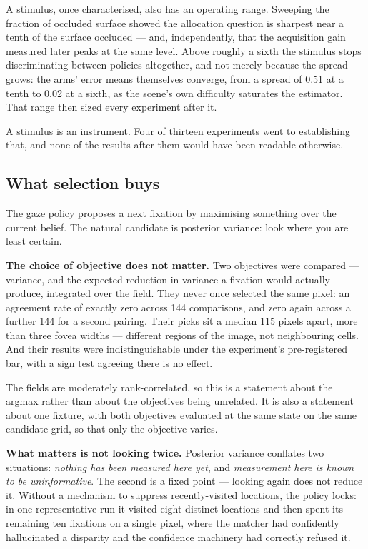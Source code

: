 A stimulus, once characterised, also has an operating range. Sweeping the
fraction of occluded surface showed the allocation question is sharpest near a
tenth of the surface occluded --- and, independently, that the acquisition gain
measured later peaks at the same level. Above roughly a sixth the stimulus stops
discriminating between policies altogether, and not merely because the spread
grows: the arms' error means themselves converge, from a spread of 0.51 at a
tenth to 0.02 at a sixth, as the scene's own difficulty saturates the estimator.
That range then sized every experiment after it.

A stimulus is an instrument. Four of thirteen experiments went to establishing
that, and none of the results after them would have been readable otherwise.

\subsection{What selection buys}

The gaze policy proposes a next fixation by maximising something over the
current belief. The natural candidate is posterior variance: look where you are
least certain.

\textbf{The choice of objective does not matter.} Two objectives were compared
--- variance, and the expected reduction in variance a fixation would actually
produce, integrated over the field. They never once selected the same pixel: an
agreement rate of exactly zero across 144 comparisons, and zero again across a
further 144 for a second pairing. Their picks sit a median 115 pixels apart,
more than three fovea widths --- different regions of the image, not
neighbouring cells. And their results were indistinguishable under the
experiment's pre-registered bar, with a sign test agreeing there is no effect.

The fields are moderately rank-correlated, so this is a statement about the
argmax rather than about the objectives being unrelated. It is also a statement
about one fixture, with both objectives evaluated at the same state on the same
candidate grid, so that only the objective varies.

\textbf{What matters is not looking twice.} Posterior variance conflates two
situations: \emph{nothing has been measured here yet}, and \emph{measurement
here is known to be uninformative}. The second is a fixed point --- looking
again does not reduce it. Without a mechanism to suppress recently-visited
locations, the policy locks: in one representative run it visited eight distinct
locations and then spent its remaining ten fixations on a single pixel, where
the matcher had confidently hallucinated a disparity and the confidence
machinery had correctly refused it.

